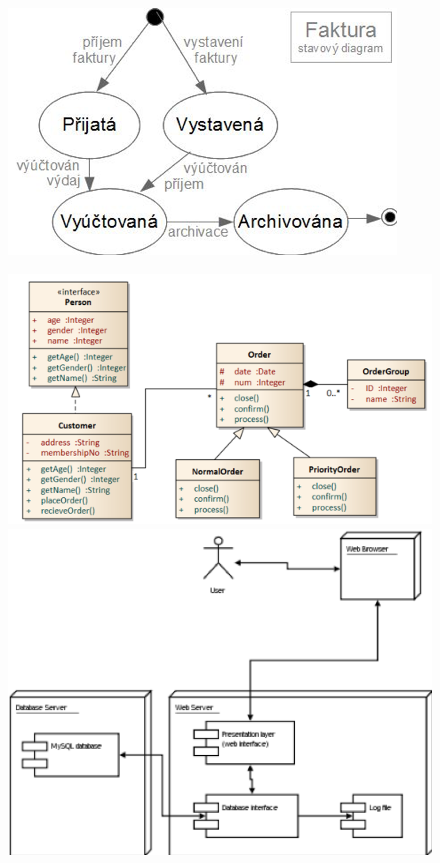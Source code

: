 \begin{figure}[H]
	\centering
	\includegraphics[width=.4\textwidth]{assets/diag_stavovy.png}
\end{figure}
\begin{figure}
	\centering
	\begin{minipage}{.5\textwidth}
		\centering
		\includegraphics[width=.95\linewidth]{assets/diag_tridni.png}
	\end{minipage}%
	\begin{minipage}{.5\textwidth}
		\centering
		\includegraphics[width=.95\linewidth]{assets/diag_nasazeni.png}
	\end{minipage}
\end{figure}

